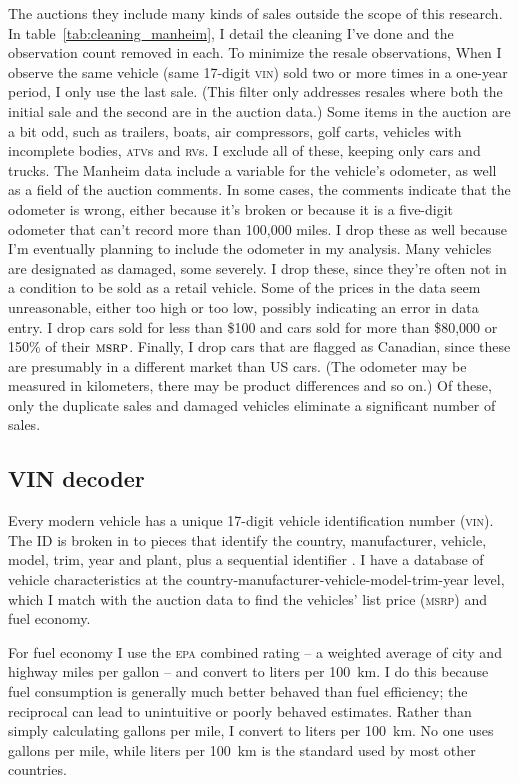 \documentclass[11pt,letterpaper,oneside]{article}
\newcommand{\msrp}{\textsc{msrp}}
\newcommand{\vin}{\textsc{vin}}
\begin{document}
\begin{doublespacing}
The auctions they include many kinds of sales outside the scope of this research.
In table~\ref{tab:cleaning_manheim}, I detail the cleaning I've done and the observation count removed in each.
To minimize the resale observations, When I observe the same vehicle (same 17-digit \vin{}) sold two or more times in a one-year period, I only use the last sale.
(This filter only addresses resales where both the initial sale and the second are in the auction data.)
Some items in the auction are a bit odd, such as trailers, boats, air compressors, golf carts, vehicles with incomplete bodies, \textsc{atv}s and \textsc{rv}s.
I exclude all of these, keeping only cars and trucks.
The Manheim data include a variable for the vehicle's odometer, as well as a field of the auction comments.
In some cases, the comments indicate that the odometer is wrong, either because it's broken or because it is a five\hyp{}digit odometer that can't record more than 100,000 miles.
I drop these as well because I'm eventually planning to include the odometer in my analysis.
Many vehicles are designated as damaged, some severely.  I drop these, since they're often not in a condition to be sold as a retail vehicle.
Some of the prices in the data seem unreasonable, either too high or too low, possibly indicating an error in data entry.
I drop cars sold for less than \$100 and cars sold for more than \$80,000 or 150\% of their $\textsc{msrp}$.
Finally, I drop cars that are flagged as Canadian, since these are presumably in a different market than US cars.
(The odometer may be measured in kilometers, there may be product differences and so on.)
Of these, only the duplicate sales and damaged vehicles eliminate a significant number of sales.


\subsection{VIN decoder}

Every modern vehicle has a unique 17-digit vehicle identification number (\vin{}).
The ID is broken in to pieces that identify the country, manufacturer, vehicle, model, trim, year and plant, plus a sequential identifier \parencite{vin_details}.
I have a database of vehicle characteristics at the country\hyp{}manufacturer\hyp{}vehicle\hyp{}model\hyp{}trim\hyp{}year level, which I match with the auction data to find the vehicles' list price (\msrp{}) and fuel economy.

For fuel economy I use the \textsc{epa} combined rating -- a weighted average of city and highway miles per gallon -- and convert to liters per 100~km.
I do this because fuel consumption is generally much better behaved than fuel efficiency; the reciprocal can lead to unintuitive or poorly behaved estimates.
Rather than simply calculating gallons per mile, I convert to liters per 100~km.
No one uses gallons per mile, while liters per 100~km is the standard used by most other countries.


\end{doublespacing}
\end{document}
